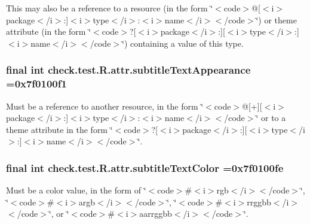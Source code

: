 This may also be a reference to a resource (in the form \char`\"{}$<$code$>$@\mbox{[}$<$i$>$package$<$/i$>$\+:\mbox{]}$<$i$>$type$<$/i$>$\+:$<$i$>$name$<$/i$>$$<$/code$>$\char`\"{}) or theme attribute (in the form \char`\"{}$<$code$>$?\mbox{[}$<$i$>$package$<$/i$>$\+:\mbox{]}\mbox{[}$<$i$>$type$<$/i$>$\+:\mbox{]}$<$i$>$name$<$/i$>$$<$/code$>$\char`\"{}) containing a value of this type. \hypertarget{classcheck_1_1test_1_1_r_1_1attr_ae5a7dacf52c904d4e7fdc131f9f9c67a}{}
\subsubsection[{subtitle\+Text\+Appearance}]{\setlength{\rightskip}{0pt plus 5cm}final int check.\+test.\+R.\+attr.\+subtitle\+Text\+Appearance =0x7f0100f1\hspace{0.3cm}{\ttfamily [static]}}\label{classcheck_1_1test_1_1_r_1_1attr_ae5a7dacf52c904d4e7fdc131f9f9c67a}
Must be a reference to another resource, in the form \char`\"{}$<$code$>$@\mbox{[}+\mbox{]}\mbox{[}$<$i$>$package$<$/i$>$\+:\mbox{]}$<$i$>$type$<$/i$>$\+:$<$i$>$name$<$/i$>$$<$/code$>$\char`\"{} or to a theme attribute in the form \char`\"{}$<$code$>$?\mbox{[}$<$i$>$package$<$/i$>$\+:\mbox{]}\mbox{[}$<$i$>$type$<$/i$>$\+:\mbox{]}$<$i$>$name$<$/i$>$$<$/code$>$\char`\"{}. \hypertarget{classcheck_1_1test_1_1_r_1_1attr_ae5402664969908118713cc1f648a3312}{}
\subsubsection[{subtitle\+Text\+Color}]{\setlength{\rightskip}{0pt plus 5cm}final int check.\+test.\+R.\+attr.\+subtitle\+Text\+Color =0x7f0100fe\hspace{0.3cm}{\ttfamily [static]}}\label{classcheck_1_1test_1_1_r_1_1attr_ae5402664969908118713cc1f648a3312}
Must be a color value, in the form of \char`\"{}$<$code$>$\#$<$i$>$rgb$<$/i$>$$<$/code$>$\char`\"{}, \char`\"{}$<$code$>$\#$<$i$>$argb$<$/i$>$$<$/code$>$\char`\"{}, \char`\"{}$<$code$>$\#$<$i$>$rrggbb$<$/i$>$$<$/code$>$\char`\"{}, or \char`\"{}$<$code$>$\#$<$i$>$aarrggbb$<$/i$>$$<$/code$>$\char`\"{}. 


